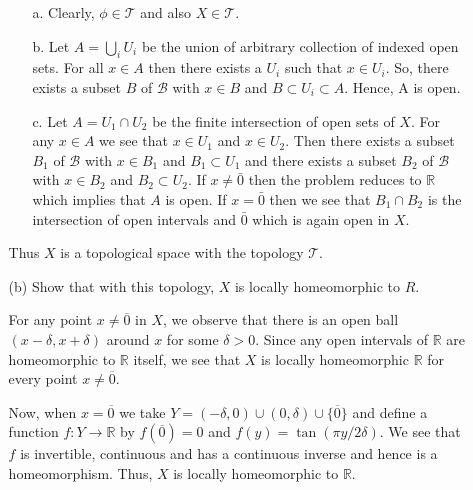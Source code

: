 \documentclass[12pt]{article}
\begin{document}
\begin{enumerate}
\begin{enumerate}
\begin{mybox}
        \begin{enumerate}
            \item[a.] Clearly, $\phi \in \mathscr{T}$ and
                also $X\in \mathscr{T}$.
            \item[b.] Let $A=\bigcup_i{U_i}$ be the union
                of arbitrary collection of indexed open sets.
                For all $x\in A$ then there exists a $U_i$ such
                that $x\in U_i$. So, there exists a
                subset $B$ of $\mathscr{B}$ with $x \in B$
                and $B \subset U_i\subset A$. Hence, A is open.
            \item[c.] Let $A=U_1\cap U_2$ be the finite
                intersection of open sets of $X$. For any
                $x\in A$ we see that $x\in U_1$ and 
                $x\in U_2$. Then
                there exists a
            subset $B_1$ of $\mathscr{B}$ with $x \in B_1$
            and $B_1 \subset U_1$ and there exists a
            subset $B_2$ of $\mathscr{B}$ with $x \in B_2$
            and $B_2 \subset U_2$. If $x\neq \bar{0}$
            then the problem reduces to $\mathbb{R}$ which implies
            that $A$ is open. If $x=\bar{0}$ then we see that
            $B_1\cap B_2$ is the intersection of open intervals and
            $\bar{0}$ which is again open in $X$.
        \end{enumerate}

        Thus $X$ is a topological space with the topology
        $\mathscr{T}$.
        \end{mybox}

    \item[(b)] Show that with this topology, $X$ is locally
        homeomorphic to $R$.
        \begin{mybox}

            For any point $x\neq \overline{0}$ in $X$,
            we observe that
            there is an open ball $(x-\delta,x+\delta)$
            around $x$ for some $\delta>0$.
            Since any open intervals of
            $\mathbb{R}$ are homeomorphic to $\mathbb{R}$
            itself, we see that $X$ is locally
            homeomorphic
            $\mathbb{R}$ for every point
            $x\neq \overline{0}$.

            \vspace*{2mm}
            Now, when $x=\overline{0}$ we take
            $Y=(-\delta,0)\cup(0,\delta)\cup
            \{\overline{0}\}$ and define a function
            $f:Y\to \mathbb{R}$ by $f(\overline{0})
            =0$ and $f(y)=\tan{(\pi y/2\delta)}$.
            We see that $f$ is invertible, continuous
            and has a continuous inverse and hence is a
            homeomorphism. Thus, $X$ is locally
            homeomorphic to $\mathbb{R}$.
        \end{mybox}


\end{enumerate}
\end{enumerate}
\end{document}
